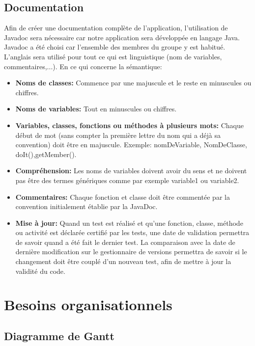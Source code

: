 \documentclass[12pt]{report}
\begin{document}
\section{Documentation}
Afin de créer une documentation complète de l'application, l'utilisation de Javadoc sera nécessaire car notre application sera développée en langage Java. Javadoc a été choisi car l'ensemble des membres du groupe y est habitué.\\
L'anglais sera utilisé pour tout ce qui est linguistique (nom de variables, commentaires,...). En ce qui concerne la sémantique:
\begin{itemize}
\item \textbf{Noms de classes: } Commence par une majuscule et le reste en minuscules ou chiffres.
\item \textbf{Noms de variables: } Tout en minuscules ou chiffres.
\item \textbf{Variables, classes, fonctions ou méthodes à plusieurs mots: } Chaque début de mot (sans compter la première lettre du nom qui a déjà sa convention) doit être en majuscule. Exemple: nomDeVariable, NomDeClasse, doIt(),getMember().
\item \textbf{Compréhension: } Les noms de variables doivent avoir du sens et ne doivent pas être des termes génériques comme par exemple variable1 ou variable2.
\item \textbf{Commentaires: } Chaque fonction et classe doit être commentée par la convention initialement établie par la JavaDoc. 
\item \textbf{Mise à jour: } Quand un test est réalisé et qu'une fonction, classe, méthode ou activité est déclarée certifié par les tests, une date de validation permettra de savoir quand a été fait le dernier test. La comparaison avec la date de dernière modification sur le gestionnaire de versions permettra de savoir si le changement doit être couplé d'un nouveau test, afin de mettre à jour la validité du code.
\end{itemize}

\newpage
\chapter*{Besoins organisationnels}
\setcounter{chapter}{3}
\setcounter{section}{0}

\section{Diagramme de Gantt}
\end{document}

